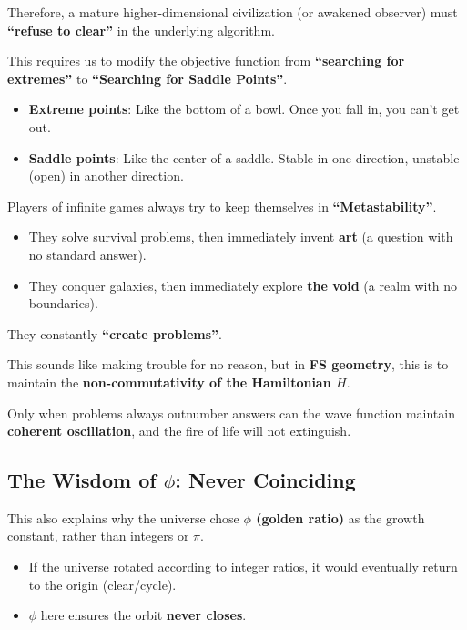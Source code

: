 Therefore, a mature higher-dimensional civilization (or awakened observer) must \textbf{``refuse to clear''} in the underlying algorithm.

This requires us to modify the objective function from \textbf{``searching for extremes''} to \textbf{``Searching for Saddle Points''}.

\begin{itemize}
\item \textbf{Extreme points}: Like the bottom of a bowl. Once you fall in, you can't get out.

\item \textbf{Saddle points}: Like the center of a saddle. Stable in one direction, unstable (open) in another direction.
\end{itemize}

Players of infinite games always try to keep themselves in \textbf{``Metastability''}.

\begin{itemize}
\item They solve survival problems, then immediately invent \textbf{art} (a question with no standard answer).

\item They conquer galaxies, then immediately explore \textbf{the void} (a realm with no boundaries).
\end{itemize}

They constantly \textbf{``create problems''}.

This sounds like making trouble for no reason, but in \textbf{FS geometry}, this is to maintain the \textbf{non-commutativity of the Hamiltonian $H$}.

Only when problems always outnumber answers can the wave function maintain \textbf{coherent oscillation}, and the fire of life will not extinguish.

\subsection{The Wisdom of $\phi$: Never Coinciding}

This also explains why the universe chose \textbf{$\phi$ (golden ratio)} as the growth constant, rather than integers or $\pi$.

\begin{itemize}
\item If the universe rotated according to integer ratios, it would eventually return to the origin (clear/cycle).

\item \textbf{$\phi$} here ensures the orbit \textbf{never closes}.
\end{itemize}

